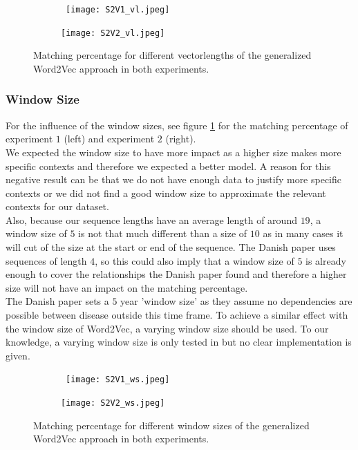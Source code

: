 \begin{figure}[!htb]
	\centering
	\begin{subfigure}[b]{.49\textwidth}\
		\texttt{[image: S2V1\_vl.jpeg]}
	\end{subfigure}
	\begin{subfigure}[b]{.49\textwidth}
		\texttt{[image: S2V2\_vl.jpeg]}
	\end{subfigure}
	\caption{Matching percentage for different vectorlengths of the generalized Word2Vec 		approach in both experiments.}
	\label{fig:s2v_vl}
\end{figure}

\subsubsection{Window Size}

For the influence of the window sizes, see figure \ref{fig:s2v_vl} for the matching percentage of experiment $1$ (left) and experiment $2$ (right). \\
We expected the window size to have more impact as a higher size makes more specific contexts and therefore we expected a better model. A reason for this negative result can be that we do not have enough data to justify more specific contexts or we did not find a good window size to approximate the relevant contexts for our dataset. \\
Also, because our sequence lengths have an average length of around $19$, a window size of $5$ is not that much different than a size of $10$ as in many cases it will cut of the size at the start or end of the sequence. The Danish paper uses sequences of length $4$, so this could also imply that a window size of $5$ is already enough to cover the relationships the Danish paper found and therefore a higher size will not have an impact on the matching percentage. \\
The Danish paper sets a $5$ year 'window size' as they assume no dependencies are possible between disease outside this time frame. To achieve a similar effect with the window size of Word2Vec, a varying window size should be used. To our knowledge, a varying window size is only tested in \cite{w2vTuning:article} but no clear implementation is given. 

\begin{figure}[!htb]
	\centering
	\begin{subfigure}[b]{.49\textwidth}\
		\texttt{[image: S2V1\_ws.jpeg]}
	\end{subfigure}
	\begin{subfigure}[b]{.49\textwidth}
		\texttt{[image: S2V2\_ws.jpeg]}
	\end{subfigure}
	\caption{Matching percentage for different window sizes of the generalized Word2Vec 		approach in both experiments.}
	\label{fig:s2v_ws}
\end{figure}



